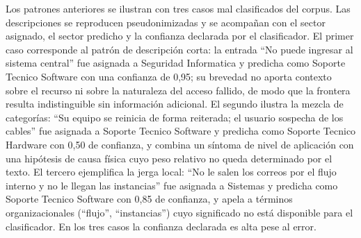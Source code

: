 Los patrones anteriores se ilustran con tres casos mal clasificados del corpus. Las descripciones se reproducen pseudonimizadas y se acompañan con el sector asignado, el sector predicho y la confianza declarada por el clasificador. El primer caso corresponde al patrón de descripción corta: la entrada ``No puede ingresar al sistema central'' fue asignada a Seguridad Informatica y predicha como Soporte Tecnico Software con una confianza de 0,95; su brevedad no aporta contexto sobre el recurso ni sobre la naturaleza del acceso fallido, de modo que la frontera resulta indistinguible sin información adicional. El segundo ilustra la mezcla de categorías: ``Su equipo se reinicia de forma reiterada; el usuario sospecha de los cables'' fue asignada a Soporte Tecnico Software y predicha como Soporte Tecnico Hardware con 0,50 de confianza, y combina un síntoma de nivel de aplicación con una hipótesis de causa física cuyo peso relativo no queda determinado por el texto. El tercero ejemplifica la jerga local: ``No le salen los correos por el flujo interno y no le llegan las instancias'' fue asignada a Sistemas y predicha como Soporte Tecnico Software con 0,85 de confianza, y apela a términos organizacionales (``flujo'', ``instancias'') cuyo significado no está disponible para el clasificador. En los tres casos la confianza declarada es alta pese al error.

\newpage
